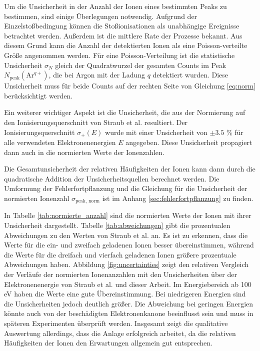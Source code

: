 Um die Unsicherheit in der Anzahl der Ionen eines bestimmten Peaks zu bestimmen, sind einige Überlegungen notwendig. Aufgrund der Einzelstoßbedingung können die Stoßionisationen als unabhängige Ereignisse betrachtet werden. Außerdem ist die mittlere Rate der Prozesse bekannt. Aus diesem Grund kann die Anzahl der detektierten Ionen als eine Poisson-verteilte Größe angenommen werden. Für eine Poisson-Verteilung ist die statistische Unsicherheit $\sigma_N$ gleich der Quadratwurzel der gesamten Counts im Peak $N_{\text{peak}}(\text{Ar}^{q+})$, die bei Argon mit der Ladung $q$ detektiert wurden. Diese Unsicherheit muss für beide Counts auf der rechten Seite von Gleichung \ref{eq:norm} berücksichtigt werden.

Ein weiterer wichtiger Aspekt ist die Unsicherheit, die aus der Normierung auf den Ionisierungsquerschnitt von Straub et al. resultiert. Der Ionisierungsquerschnitt $\sigma_+(E)$ wurde mit einer Unsicherheit von $\pm 3.5$ \% für alle verwendeten Elektronenenergien $E$ angegeben. Diese Unsicherheit propagiert dann auch in die normierten Werte der Ionenzahlen. 

Die Gesamtunsicherheit der relativen Häufigkeiten der Ionen kann dann durch die quadratische Addition der Unsicherheitsquellen berechnet werden. Die Umformung der Fehlerfortpflanzung und die Gleichung für die Unsicherheit der normierten Ionenzahl $\sigma_\text{peak, norm}$ ist im Anhang \ref{sec:fehlerfortpflanzung} zu finden.

In Tabelle \ref{tab:normierte_anzahl} sind die normierten Werte der Ionen mit ihrer Unsicherheit dargestellt. Tabelle \ref{tab:abweichungen} gibt die prozentualen Abweichungen zu den Werten von Straub et al. \cite{Straub} an. Es ist zu erkennen, dass die Werte für die ein- und zweifach geladenen Ionen besser übereinstimmen, während die Werte für die dreifach und vierfach geladenen Ionen größere prozentuale Abweichungen haben. Abbildung \ref{fig:uncertainties} zeigt den relativen Vergleich der Verläufe der normierten Ionenanzahlen mit den Unsicherheiten über der Elektronenenergie von Straub et al. und dieser Arbeit. Im Energiebereich ab 100 eV haben die Werte eine gute Übereinstimmung. Bei niedrigeren Energien sind die Unsicherheiten jedoch deutlich größer. Die Abweichung bei geringen Energien könnte auch von der beschädigten Elektronenkanone beeinflusst sein und muss in späteren Experimenten überprüft werden. Insgesamt zeigt die qualitative Auswertung allerdings, dass die Anlage erfolgreich arbeitet, da die relativen Häufigkeiten der Ionen den Erwartungen allgemein gut entsprechen.  

